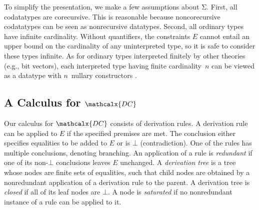 \documentclass[smallcondensed,draft]{svjour3}
\newcommand\Sig{\mathrm{\Sigma}}
\newcommand\const[1]{\textsf{#1}}
\renewcommand{\vec}[1]{\bar #1}
\newcommand{\Ec}{E}
\newcommand{\thD}{\mathcalx{DC}}
\newcommand\Types{\mathcalx{Y}}
\newcommand\Codata{\Types_{\mathrm{codt}}}
\newcommand\negvthinspace{\kern-0.083333em}
\begin{document}
To simplify the presentation, we make a few assumptions about
$\Sig$.
First, all codatatypes %
are corecursive. This is reasonable
because noncorecursive codatatypes can be seen as nonrecursive
datatypes.
Second, all ordinary types have infinite cardinality.
Without quantifiers, the constraints $\Ec$ cannot entail an upper
bound on the cardinality of any uninterpreted type, so it is safe to consider these types
infinite. As for ordinary types interpreted finitely by other theories (e.g.,
bit vectors), each interpreted type having finite cardinality~$n$
can be viewed as a %
datatype with $n$~nullary constructors
\cite{barrett-et-al-2007}.


\subsection{A Calculus for $\thD$}
\label{sec:calculus-for-dc}



Our calculus for $\thD$ consists of derivation rules.
A derivation rule can be applied to $\Ec$ if %
the specified
premises are met.
The conclusion either specifies equalities to be added to $\Ec$
or is $\bot$ (contradiction).
One of the rules has multiple conclusions, %
denoting branching.
%
An application of a rule is \emph{redundant} if one of its non-$\bot$
conclusions leaves $\Ec$ unchanged.
A \emph{derivation tree} is a %
tree whose nodes are finite sets of
equalities, such that child nodes are obtained by a nonredundant application of a
derivation rule to the parent. A derivation tree is \emph{closed} if all of
its leaf nodes are $\bot$. A node is \emph{saturated} if no nonredundant
instance of a rule can be applied to it.
\end{document}
